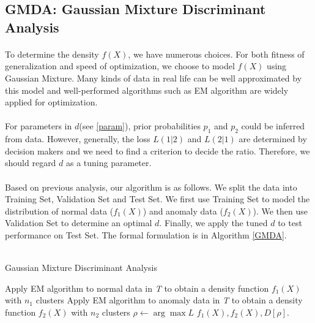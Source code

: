 \documentclass[english]{article}
\begin{document}
\subsection{GMDA: Gaussian Mixture Discriminant Analysis}
\paragraph{}
To determine the density $f(X)$, we have numerous choices. For both fitness of generalization and speed of optimization, we choose to model $f(X)$ using Gaussian Mixture. Many kinds of data in real life can be well approximated by this model and well-performed algorithms such as EM algorithm are widely applied for optimization.
\paragraph{}
For parameters in $d$(see \ref{param}), prior probabilities $p_1$ and $p_2$ could be inferred from data. However, generally, the loss $L(1|2)$ and $L(2|1)$ are determined by decision makers and we need to find a criterion to decide the ratio. Therefore, we should regard $d$ as a tuning parameter. 
\paragraph{}
Based on previous analysis, our algorithm is as follows. We split the data into Training Set, Validation Set and Test Set. We first use Training Set to model the distribution of normal data ($f_1(X)$) and anomaly data ($f_2(X)$). We then use Validation Set to determine an optimal $d$. Finally, we apply the tuned $d$ to test performance on Test Set. The formal formulation is in Algorithm \ref{GMDA}.
\\\\
\begin{algorithm}[H]
\label{GMDA}
\caption{Gaussian Mixture Discriminant Analysis}
\SetAlgoLined
		Apply EM algorithm to normal data in \textit{T} to obtain a density function $f_1(X)$ with $n_1$ clusters\;
		Apply EM algorithm to anomaly data in \textit{T} to obtain a density function $f_2(X)$ with $n_2$ clusters\;
		$\rho \gets \arg\max L$\;
		\Return $f_1(X), f_2(X), D[\rho]$.
\end{algorithm}
 
\end{document}

